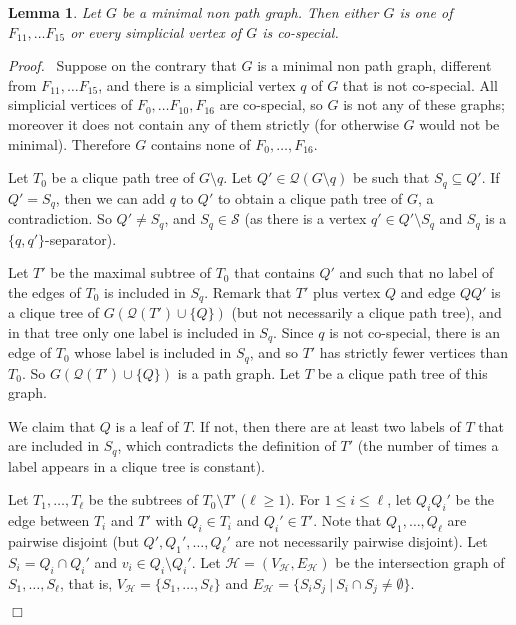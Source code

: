\documentclass[11pt]{article}
\newtheorem{lemma}{Lemma}
\newenvironment{proof}{\noindent \emph{Proof.}\ }{\hfill
    $\Box$\vspace{1em}}
\begin{document}
\begin{lemma}
\label{cospecial}
Let $G$ be a minimal non path graph.  Then either $G$ is one of
$F_{11},\ldots F_{15}$ or every simplicial vertex of $G$ is
co-special.
\end{lemma}
\begin{proof}
Suppose on the contrary that $G$ is a minimal non path graph,
different from $F_{11},\ldots F_{15}$, and there is a simplicial
vertex $q$ of $G$ that is not co-special.  All simplicial vertices of
$F_0,\ldots F_{10}, F_{16}$ are co-special, so $G$ is not any of these
graphs; moreover it does not contain any of them strictly (for
otherwise $G$ would not be minimal).  Therefore $G$ contains none of
$F_0, \ldots, F_{16}$.

Let $T_0$ be a clique path tree of $G\setminus q$.  Let $Q'\in
\mathcal Q(G\setminus q)$ be such that $S_q\subseteq Q'$.  If
$Q'=S_q$, then we can add $q$ to $Q'$ to obtain a clique path tree of
$G$, a contradiction.  So $Q'\neq S_q$, and $S_q \in \mathcal S$ (as
there is a vertex $q'\in Q'\setminus S_q$ and $S_q$ is a $\{q,
q'\}$-separator).

Let $T'$ be the maximal subtree of $T_0$ that contains $Q'$ and such
that no label of the edges of $T_0$ is included in $S_q$.  Remark that
$T'$ plus vertex $Q$ and edge $QQ'$ is a clique tree of $G(\mathcal
Q(T')\cup \{Q\})$ (but not necessarily a clique path tree), and in
that tree only one label is included in $S_q$.  Since $q$ is not
co-special, there is an edge of $T_0$ whose label is included in
$S_q$, and so $T'$ has strictly fewer vertices than $T_0$.  So
$G(\mathcal Q(T')\cup \{Q\})$ is a path graph.  Let $T$ be a clique
path tree of this graph.

We claim that $Q$ is a leaf of $T$.  If not, then there are at least
two labels of $T$ that are included in $S_q$, which contradicts the
definition of $T'$ (the number of times a label appears in a clique
tree is constant).

Let $T_1,\ldots, T_\ell$ be the subtrees of $T_0\setminus T'$
($\ell\geq 1$).  For $1\leq i\leq \ell$, let $Q_iQ_i'$ be the edge
between $T_i$ and $T'$ with $Q_i\in T_i$ and $Q_i'\in T'$.  Note that
$Q_1, \ldots, Q_\ell$ are pairwise disjoint (but $Q', Q_1', \ldots,
Q_\ell'$ are not necessarily pairwise disjoint).  Let $S_i=Q_i\cap
Q_i'$ and $v_i\in Q_i\setminus Q_i'$.  Let ${\mathcal H}= (V_{\mathcal
H}, E_{\mathcal H})$ be the intersection graph of $S_1, \ldots,
S_\ell$, that is, $V_{\mathcal H}= \{ S_1, \ldots, S_\ell\}$ and
$E_{\mathcal H}=\{ S_i S_j\ |\ S_i\cap S_j\neq \emptyset\}$.


\end{proof}
\end{document}
